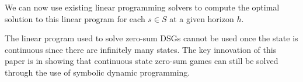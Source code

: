 We can now use existing linear programming solvers to compute the optimal
solution to this linear program for each $s \in S$ at a given horizon $h$.

The linear program used to solve zero-sum DSGs cannot be used once
the state is continuous since there are infinitely many states. The key 
innovation of this paper is in showing that continuous state zero-sum
games can still be solved through the use of symbolic dynamic programming.